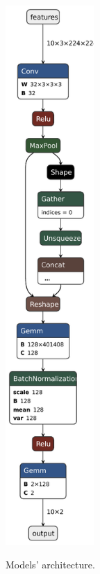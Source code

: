 \documentclass[runningheads]{llncs}
\begin{document}
\begin{figure}[H]
{\includegraphics[width=0.30\textwidth]{Models/EnhancedCNN.pdf}
}
\label{SimpleCNNs}
\caption{Models' architecture.}
\end{figure}
%
%
%
% 
% 
\end{document}
